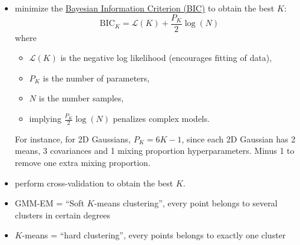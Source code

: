 \documentclass[twocolumn,landscape,10pt]{article}
\theoremstyle{definition}
\begin{document}
\begin{itemize}
\begin{itemize}
            \item minimize the \underline{Bayesian Information Criterion (BIC)}
                to obtain the best $K$:
                \[
                    \text{BIC}_K=\mathcal{L}(K)+\frac{P_K}{2}\log(N)
                \]
                where 
                \begin{itemize}
                    \item 
                        $\mathcal{L}(K)$ is the negative log likelihood
                        (encourages fitting of data),
                    \item $P_K$ is the number of parameters,
                    \item $N$ is the number samples, 
                    \item implying $\frac{P_K}{2}\log(N)$ penalizes
                        complex models.
                \end{itemize} 
                For instance, for 2D Gaussians, $P_K=6K-1$, since each 2D
                Gaussian has 2 means, 3 covariances and 1 mixing proportion
                hyperparameters. Minus 1 to remove one extra mixing proportion.
            \item perform cross-validation to obtain the best $K$.
            \item GMM-EM = ``Soft $K$-means clustering'', every point belongs to
                several clusters in certain degrees
            \item $K$-means = ``hard clustering'', every points belongs to
                exactly one cluster
        \end{itemize} 
\end{itemize} 
\end{document}
